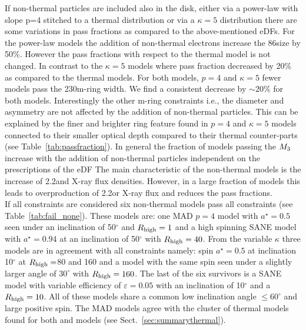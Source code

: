 If non-thermal particles are included also in the disk, either via a power-law with slope p=4 stitched to a thermal distribution or via a $\kappa=5$ distribution there are some variations in pass fractions as compared to the above-mentioned eDFs.
\newline For the power-law models the addition of non-thermal electrons increase the 86\GHz size by 50\%. However the pass fractions with respect to the thermal model is not changed. In contrast to the $\kappa=5$ models where pass fraction decreased by 20\% as compared to the thermal models.
\newline For both models, $p=4$ and $\kappa=5$ fewer models pass the 230\GHz m-ring width. We find a consistent decrease by $\sim20\%$ for both models. Interestingly the other m-ring constraints i.e., the diameter and asymmetry are not affected by the addition of non-thermal particles. This can be explained by the finer and brighter ring feature found in $p=4$ and $\kappa=5$ models connected to their smaller optical depth compared to their thermal counter-parts (see Table~\ref{tab:passfraction}). 
\newline In general the fraction of models passing the $M_{3}$ increase with the addition of non-thermal particles independent on the prescriptions of the eDF %
\newline The main characteristic of the non-thermal models is the increase of 2.2\um and X-ray flux densities. However, in a large fraction of models this leads to overproduction of 2.2\um or X-ray flux and reduces the pass fractions.\\


If all constraints are considered six non-thermal models pass all constraints (see Table~\ref{tab:fail_none}). These models are: one \hamr MAD $p=4$ model with $a^\star=0.5$ seen under an inclination of 50$^\circ$ and  $R_{\rm high}=1$ and a high spinning SANE model with $a^\star=0.94$ at an inclination of 50$^\circ$ with $R_{\rm high}=40$. From the \bhac variable $\kappa$ three models are in agreement with all constraints namely: spin $a^\star=0.5$ at inclination 10$^\circ$ at $R_{\rm high}=$80 and 160 and a model with the same spin seen under a slightly larger angle of $30^\circ$ with $R_{\rm high}=160$. The last of the six survivors is a \bhac SANE model with variable efficiency of  $\varepsilon=0.05$ with an inclination of 10$^\circ$ and a $R_{\rm high}=10$. All of these models share a common low inclination angle $\leq 60^\circ$ and large positive spin. The MAD models agree with the cluster of thermal models found for both \bhac and \kharma models (see Sect.~\ref{sec:summarythermal}).

